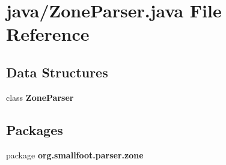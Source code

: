 \section{java/\+Zone\+Parser.java File Reference}
\label{ZoneParser_8java}
\subsection*{Data Structures}
\begin{DoxyCompactItemize}
\item 
class {\bf Zone\+Parser}
\end{DoxyCompactItemize}
\subsection*{Packages}
\begin{DoxyCompactItemize}
\item 
package {\bf org.\+smallfoot.\+parser.\+zone}
\end{DoxyCompactItemize}
